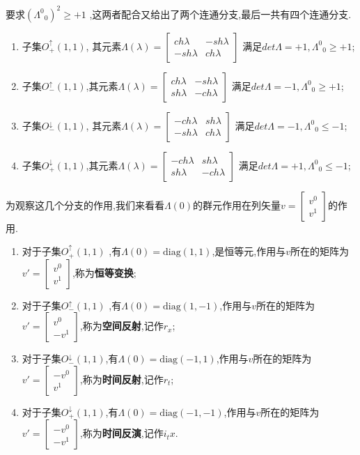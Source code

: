 \documentclass[../main.tex]{subfiles}
\begin{document}
要求$(\Lambda^{0}{}_{0})^2\ge +1$ ,这两者配合又给出了两个连通分支,最后一共有四个连通分支.
\begin{enumerate}
    \item 子集$O^\uparrow_+(1,1)$, 其元素$\Lambda(\lambda) = \begin{bmatrix}ch\lambda&-sh\lambda \\ -sh\lambda & ch\lambda\end{bmatrix}$ 满足$det\Lambda = +1, \Lambda^0{}_0\ge +1$; 
    \item 子集$O^\uparrow_-(1,1)$,其元素$\Lambda(\lambda) = \begin{bmatrix}ch\lambda&-sh\lambda \\ sh\lambda &-ch\lambda\end{bmatrix}$ 满足$det\Lambda = -1, \Lambda^0{}_0\ge +1$;
    \item 子集$O^\downarrow_-(1,1)$, 其元素$\Lambda(\lambda) = \begin{bmatrix}-ch\lambda&sh\lambda \\ -sh\lambda & ch\lambda\end{bmatrix}$ 满足$det\Lambda = -1, \Lambda^0{}_0\le -1$;
    \item 子集$O^\downarrow_+(1,1)$,其元素$\Lambda(\lambda) = \begin{bmatrix}-ch\lambda&sh\lambda \\ sh\lambda &-ch\lambda\end{bmatrix}$ 满足$det\Lambda = +1, \Lambda^0{}_0\le -1$;
\end{enumerate}
为观察这几个分支的作用,我们来看看$\Lambda(0)$的群元作用在列矢量$v = \begin{bmatrix}v^0\\v^1\end{bmatrix}$的作用.
\begin{enumerate}
    \item 对于子集$O^\uparrow_+(1,1)$  ,有$\Lambda(0) =\text{diag}(1,1)$,是恒等元,作用与$v$所在的矩阵为$v'=\begin{bmatrix}v^0\\v^1 \end{bmatrix}$,称为\textbf{恒等变换};
    \item 对于子集$O^\uparrow_-(1,1)$  ,有$\Lambda(0) =\text{diag}(1,-1) $,作用与$v$所在的矩阵为$v'=\begin{bmatrix}v^0\\-v^1\end{bmatrix}$,称为\textbf{空间反射},记作$r_x$;
    \item 对于子集$O^\downarrow_-(1,1)$,有$\Lambda(0) =\text{diag}(-1,1) $,作用与$v$所在的矩阵为$v'=\begin{bmatrix}-v^0\\v^1\end{bmatrix}$,称为\textbf{时间反射},记作$r_t$;
    \item 对于子集$O^\downarrow_+(1,1)$,有$\Lambda(0) =\text{diag}(-1,-1) $,作用与$v$所在的矩阵为$v'=\begin{bmatrix}-v^0\\-v^1\end{bmatrix}$,称为\textbf{时间反演},记作$i_tx$.
\end{enumerate}
\end{document}

